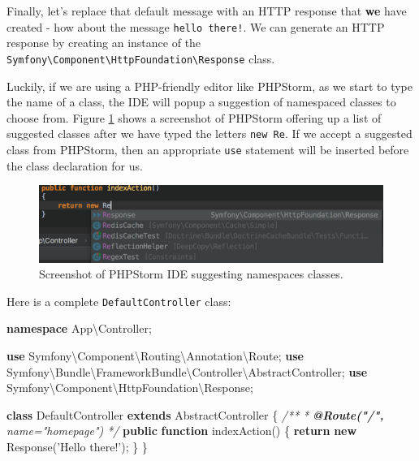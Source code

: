 \documentclass[a4paperpaper,openright]{book}
\newenvironment{Shaded}{}{}
\newcommand{\AnnotationTok}[1]{\textcolor[rgb]{0.38,0.63,0.69}{\textbf{\textit{#1}}}}
\newcommand{\CommentTok}[1]{\textcolor[rgb]{0.38,0.63,0.69}{\textit{#1}}}
\newcommand{\KeywordTok}[1]{\textcolor[rgb]{0.00,0.44,0.13}{\textbf{#1}}}
\newcommand{\NormalTok}[1]{#1}
\newcommand{\OtherTok}[1]{\textcolor[rgb]{0.00,0.44,0.13}{#1}}
\newcommand{\StringTok}[1]{\textcolor[rgb]{0.25,0.44,0.63}{#1}}
\begin{document}
Finally, let's replace that default message with an HTTP response that
\textbf{we} have created - how about the message \texttt{hello\ there!}.
We can generate an HTTP response by creating an instance of the
\texttt{Symfony\textbackslash{}Component\textbackslash{}HttpFoundation\textbackslash{}Response}
class.

Luckily, if we are using a PHP-friendly editor like PHPStorm, as we
start to type the name of a class, the IDE will popup a suggestion of
namespaced classes to choose from. Figure \ref{phpstorm_response} shows
a screenshot of PHPStorm offering up a list of suggested classes after
we have typed the letters \texttt{new\ Re}. If we accept a suggested
class from PHPStorm, then an appropriate \texttt{use} statement will be
inserted before the class declaration for us.

\begin{figure}
\centering
\includegraphics{./tex2pdf.-65f13e14688ab55b/99d1c7b61646671719a4ba00450a74787e31b522.png}
\caption{Screenshot of PHPStorm IDE suggesting namespaces classes.
\label{phpstorm_response}}
\end{figure}

Here is a complete \texttt{DefaultController} class:

\begin{Shaded}
\begin{Highlighting}[]
    \KeywordTok{namespace}\NormalTok{ App\textbackslash{}Controller}\OtherTok{;}

    \KeywordTok{use}\NormalTok{ Symfony\textbackslash{}Component\textbackslash{}Routing\textbackslash{}Annotation\textbackslash{}Route}\OtherTok{;}
    \KeywordTok{use}\NormalTok{ Symfony\textbackslash{}Bundle\textbackslash{}FrameworkBundle\textbackslash{}Controller\textbackslash{}AbstractController}\OtherTok{;}
    \KeywordTok{use}\NormalTok{ Symfony\textbackslash{}Component\textbackslash{}HttpFoundation\textbackslash{}Response}\OtherTok{;}

    \KeywordTok{class}\NormalTok{ DefaultController }\KeywordTok{extends}\NormalTok{ AbstractController}
\NormalTok{    \{}
        \CommentTok{/**}
\CommentTok{         * }\AnnotationTok{@Route("/",}\CommentTok{ name="homepage")}
\CommentTok{         */}
        \KeywordTok{public} \KeywordTok{function}\NormalTok{ indexAction}\OtherTok{()}
\NormalTok{        \{}
            \KeywordTok{return} \KeywordTok{new}\NormalTok{ Response}\OtherTok{(}\StringTok{'Hello there!'}\OtherTok{);}
\NormalTok{        \}}
\NormalTok{    \}}
\end{Highlighting}
\end{Shaded}
\end{document}
